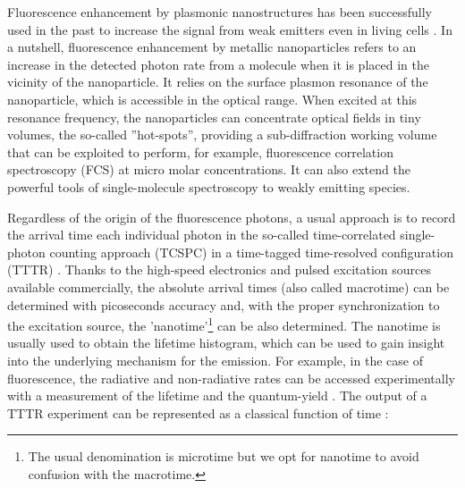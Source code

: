 %

Fluorescence enhancement by plasmonic nanostructures has been successfully 
used in the past to increase the signal from weak 
emitters\cite{kinkhabwala2009large, yuan2013thousand, khatua2014resonant} even in 
living cells \cite{vanzanten2010imaging}. In a nutshell, fluorescence enhancement
by metallic nanoparticles refers to an increase in the detected 
photon rate from a molecule when it is placed in the vicinity of the nanoparticle.
It relies on the surface plasmon resonance of the nanoparticle, which is accessible
in the optical range. When excited at this resonance frequency, 
the nanoparticles can concentrate optical fields in tiny volumes,
the so-called ''hot-spots'', providing a sub-diffraction 
working volume that can be exploited to perform, for example, 
fluorescence correlation spectroscopy (FCS) at micro molar 
concentrations\cite{estrada2008,manzo2011nanoscale,punj2013gold,khatua2015enhanced}.
It can also extend the powerful tools of single-molecule spectroscopy to 
weakly emitting species.


Regardless of the origin of the fluorescence photons, a usual approach is to record the arrival time each individual 
photon in the so-called time-correlated single-photon counting approach (TCSPC) in a time-tagged 
time-resolved configuration (TTTR) \cite{Wahl_picoquant}. 
Thanks to the high-speed electronics and pulsed excitation sources available commercially, 
the absolute arrival times (also called macrotime) can be determined with picoseconds accuracy and, with the proper synchronization to the excitation source, the 'nanotime'\footnote{The usual denomination is microtime but we opt for nanotime to avoid confusion with the macrotime.} can be also determined. 
The nanotime is usually used to obtain the lifetime histogram, which can be used to 
gain insight into the underlying mechanism for the emission. For example, 
in the case of fluorescence, the radiative and non-radiative rates can be accessed experimentally with a 
measurement of the lifetime and the quantum-yield \cite{lakowicz2007principles}.
The output of a TTTR experiment can be represented as a classical function of time \cite{Lippitz2005}:

